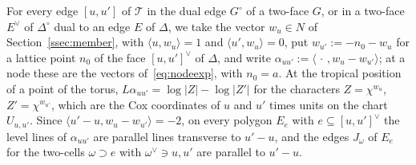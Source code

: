 For every edge $[u,u']$ of $\mathcal T$ in the dual edge $G^\circ$ of a two-face $G$, or in a two-face $E^\vee$ of
$\Delta^\circ$ dual to an edge $E$ of $\Delta$, we take the vector $w_u\in N$ of Section~\ref{ssec:member}, with
$\langle u,w_u\rangle=1$ and $\langle u',w_u\rangle=0$, put $w_{u'}:=-n_0-w_u$ for a lattice point $n_0$ of the face
$[u,u']^\vee$ of $\Delta$, and write $\alpha_{uu'}:=\langle\,\cdot\,,w_u-w_{u'}\rangle$; at a node these are the vectors
of~\eqref{eq:nodeexp}, with $n_0=a$. At the tropical position of a point of the torus,
$L\alpha_{uu'}=\log|Z|-\log|Z'|$ for the characters $Z=\chi^{w_u}$, $Z'=\chi^{w_{u'}}$, which are the Cox coordinates of
$u$ and $u'$ times units on the chart $U_{u,u'}$. Since $\langle u'-u,w_u-w_{u'}\rangle=-2$, on every polygon $E_e$ with
$e\subseteq[u,u']^\vee$ the level lines of $\alpha_{uu'}$ are parallel lines transverse to $u'-u$, and the edges
$J_\omega$ of $E_e$ for the two-cells $\omega\supset e$ with $\omega^\vee\ni u,u'$ are parallel to $u'-u$.

